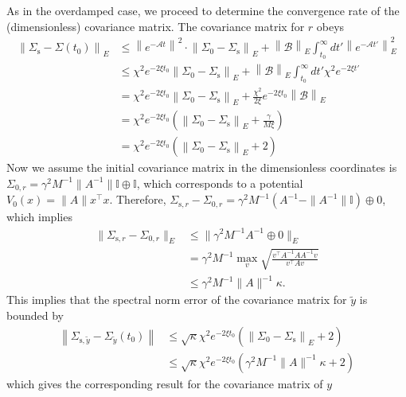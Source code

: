 \documentclass[prx,onecolumn,floatfix,longbibliography,notitlepage, nofootinbib,12pt]{revtex4-2}
\renewcommand{\leq}{\leqslant}
\begin{document}
\begin{appendix}
\begin{equation}
\end{equation}
As in the overdamped case, we proceed to determine the convergence rate of the (dimensionless) covariance matrix. The covariance matrix for $r$ obeys
\begin{align}
    \left\|\Sigma_\text{s} - \Sigma(t_0) \right\|_E
 & \leq 
  \left\| e^{-\mathcal{A} t}\right\|^2 \cdot \left\| \Sigma_0 - \Sigma_\text{s}\right\|_E+ \left\|\mathcal{B}\right\|_E\int_{t_0}^\infty dt' \left\| e^{-\mathcal{A} t'}\right\|_E^2 \\
  & \leq    \chi^2 e^{- 2\xi t_0 }\left\| \Sigma_0 - \Sigma_\text{s}\right\|_E+ \left\|\mathcal{B}\right\|_E\int_{t_0}^\infty dt'\chi^2 e^{-2\xi t'} \\
  & =  \chi^2 e^{- 2\xi t_0 }\left\| \Sigma_0 - \Sigma_\text{s}\right\|_E+\frac{\chi^2}{2\xi}e^{-2 \xi t_0} \left\|\mathcal{B}\right\|_E \\
  & = \chi^2 e^{- 2\xi t_0 }\left(\left\| \Sigma_0 - \Sigma_\text{s}\right\|_E+\frac{\gamma }{M \xi}\right)\\
  & =  \chi^2 e^{- 2\xi t_0 }\left(\left\| \Sigma_0 - \Sigma_\text{s}\right\|_E+2\right)
\end{align} 
Now we assume the initial covariance matrix in the dimensionless coordinates is $\Sigma_{0,r} = \gamma^2 M^{-1} \|A^{-1}\| \mathbb{I}\oplus \mathbb{I}$, which corresponds to a potential $V_0(x) = \|A\| x^\intercal x$. Therefore, $\Sigma_{\text{s},r} - \Sigma_{0,r} = \gamma^2 M^{-1}( A^{-1} - \|A^{-1}\|\mathbb{I}) \oplus 0$, which implies
\begin{align}
    \|\Sigma_{\text{s},r} - \Sigma_{0,r}\|_E &\leq \|\gamma^2 M^{-1} A^{-1}\oplus 0\|_E \\
    & =\gamma^2 M^{-1} \max_{v} \sqrt{\frac{v^\intercal A^{-1}AA^{-1} v}{v^\intercal A v}} \\
    & \leq \gamma^2 M^{-1} \|A\|^{-1} \kappa.
\end{align}
This implies that the spectral norm error of the covariance matrix for $\tilde{y}$ is bounded by
\begin{align}
    \left\|\Sigma_{\text{s},\tilde{y}} - \Sigma_{\tilde{y}}(t_0)\right\| &\leq
    \sqrt{\kappa}\chi^2 e^{- 2\xi t_0 }\left(\left\| \Sigma_0 - \Sigma_\text{s}\right\|_E+2\right)\\
    & \leq \sqrt{\kappa}\chi^2 e^{- 2\xi t_0 }\left(\gamma^2 M^{-1} \|A\|^{-1} \kappa+2\right)
\end{align}
which gives the corresponding result for the covariance matrix of $y$
\begin{equation}

\end{equation}
\end{appendix}
\end{document}
